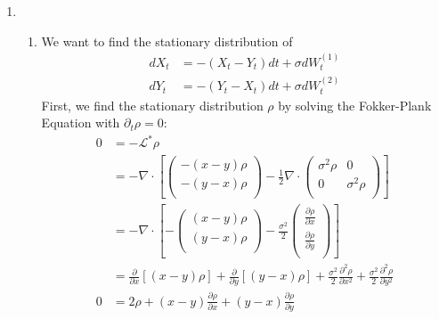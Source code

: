 \documentclass[12pt]{article}
\theoremstyle{plain}
\theoremstyle{definition}
\theoremstyle{remark}
\begin{document}
\begin{enumerate}
  \item %
    \begin{enumerate}
      \item %
        We want to find the stationary distribution of
        \begin{align*}
          dX_t &= -(X_t - Y_t)dt + \sigma dW_t^{(1)} \\
          dY_t &= -(Y_t - X_t)dt + \sigma dW_t^{(2)}
        \end{align*}
        First, we find the stationary distribution $\rho$ by solving the
        Fokker-Plank Equation with $\partial_t \rho=0$:
        \begin{align*}
          0 &= -\mathscr{L}^*\rho\\
          &= -\nabla \cdot
          \left[
          \begin{pmatrix}
            -(x-y)\rho\\
            -(y-x)\rho\\
          \end{pmatrix}
          - \frac{1}{2} \nabla \cdot
          \begin{pmatrix}
            \sigma^2 \rho & 0 \\
            0 & \sigma^2 \rho\\
          \end{pmatrix}
          \right]\\
          &= -\nabla \cdot
          \left[
          -\begin{pmatrix}
            (x-y)\rho\\
            (y-x)\rho\\
          \end{pmatrix}
          - \frac{\sigma^2 }{2}
          \begin{pmatrix}
            \frac{\partial \rho}{\partial x} \\
            \frac{\partial \rho}{\partial y} \\
          \end{pmatrix}
          \right]\\
          &=
          \frac{\partial}{\partial x}[(x-y)\rho]
          +
          \frac{\partial}{\partial y}[(y-x)\rho]
          +
          \frac{\sigma^2 }{2}
            \frac{\partial^2 \rho}{\partial x^2}
          +
          \frac{\sigma^2 }{2}
            \frac{\partial^2 \rho}{\partial y^2}\\
          0 &=
          2\rho + (x-y)\frac{\partial\rho}{\partial x}
          + (y-x)\frac{\partial\rho}{\partial y}

\end{align*}
\end{enumerate}
\end{enumerate}
\end{document}
